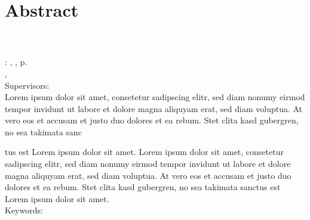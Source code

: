 \chapter*{Abstract}
\thispagestyle{empty}

\myName\\
\myTitle\\
\myLocation : \myUni , \myTime , \pageref{LastPage} p.\\
\myDegree , \mySubject\\
Supervisors: \mySupervisor\\

\noindent
Lorem ipsum dolor sit amet, consetetur sadipscing elitr, sed diam nonumy eirmod tempor invidunt ut labore et dolore magna aliquyam erat, sed diam voluptua. At vero eos et accusam et justo duo dolores et ea rebum. Stet clita kasd gubergren, no sea takimata sanc\par tus est Lorem ipsum dolor sit amet. Lorem ipsum dolor sit amet, consetetur sadipscing elitr, sed diam nonumy eirmod tempor invidunt ut labore et dolore magna aliquyam erat, sed diam voluptua. At vero eos et accusam et justo duo dolores et ea rebum. Stet clita kasd gubergren, no sea takimata sanctus est Lorem ipsum dolor sit amet.\\

\noindent
Keywords: \myKeywords